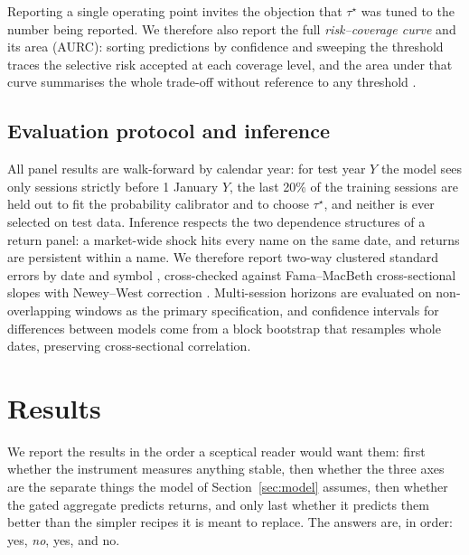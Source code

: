 Reporting a single operating point invites the objection that $\tau^\star$ was
tuned to the number being reported. We therefore also report the full
\emph{risk--coverage curve} and its area (AURC): sorting predictions by
confidence and sweeping the threshold traces the selective risk accepted at each
coverage level, and the area under that curve summarises the whole trade-off
without reference to any threshold \citep{elyaniv2010,geifman2017}.

\subsection{Evaluation protocol and inference}\label{sec:inference}

All panel results are walk-forward by calendar year: for test year $Y$ the model
sees only sessions strictly before 1 January $Y$, the last 20\% of the training
sessions are held out to fit the probability calibrator and to choose
$\tau^\star$, and neither is ever selected on test data. Inference respects the
two dependence structures of a return panel: a market-wide shock hits every name
on the same date, and returns are persistent within a name. We therefore report
two-way clustered standard errors by date and symbol \citep{cameron2011},
cross-checked against Fama--MacBeth cross-sectional slopes with Newey--West
correction \citep{famamacbeth1973,neweywest1987}. Multi-session horizons are
evaluated on non-overlapping windows as the primary specification, and confidence
intervals for differences between models come from a block bootstrap that
resamples whole dates, preserving cross-sectional correlation.

\section{Results}\label{sec:results}

We report the results in the order a sceptical reader would want them: first
whether the instrument measures anything stable, then whether the three axes are
the separate things the model of Section~\ref{sec:model} assumes, then whether the
gated aggregate predicts returns, and only last whether it predicts them better
than the simpler recipes it is meant to replace. The answers are, in order: yes,
\emph{no}, yes, and no.



